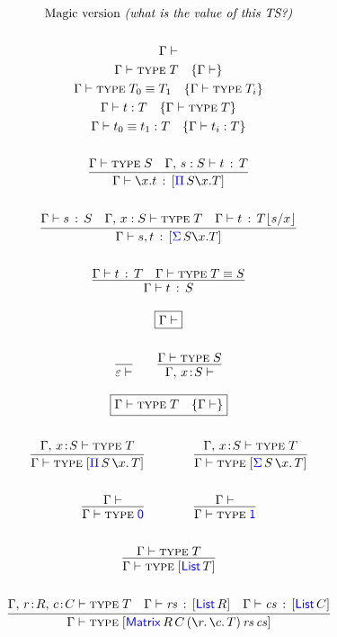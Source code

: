 \documentclass[12pt, a4paper]{article}
\newcommand{\bsl}{\texttt{\symbol{92}}}
\newcommand{\Type}{\textsc{type}\;}
\newcommand{\Zero}{\single{\D{0}}}
\newcommand{\One}{\single{\D{1}}}
\newcommand{\gp}{\,}
\newcommand{\forms}[3]{
  \ifthenelse{\equal{{#2}}{}}
  {\textcolor{#3}{\gp {#1}}}
  {[\textcolor{#3}{#1}\gp {#2}]}
}
\newcommand{\typeIntro}[2]{\forms{#1}{#2}{blue}}
\newcommand{\subst}[2]{{#1}\lfloor {#2} \rfloor}
\newcommand{\D}[1]{\textcolor{blue}{\mathsf{#1}}}
\newcommand{\List}[1]{[ \D{List} \gp {#1} ]}
\newcommand{\Matrix}[7]{[ \D{Matrix} \gp {#1} \gp {#2} \gp ( \la{#3}\la{#4} {#5}) \gp {#6} \gp {#7}]}
\newcommand{\MRCT}[2]{\Matrix{R}{C}{r}{c}{T}{#1}{#2}}
\newcommand{\ctxValid}[1]{{#1} \vdash}
\newcommand{\empCtx}{\varepsilon }
\newcommand{\ctxType}[2]{{#1} \vdash \Type {#2}}
\newcommand{\hasType}[3]{{#1} \vdash {#2} \hab {#3}}
\newcommand{\cs}{,\,}
\newcommand{\hb}{\!:\!}
\newcommand{\hab}{\gp : \gp}
\newcommand{\la}[1]{\bsl{#1}.\,}
\newcommand{\V}[1]{\mathit{#1}}
\newcommand{\single}[1]{#1}
\begin{document}
\begin{gather*}
  \text{Magic version \emph{(what is the value of this TS?)}}
  \\ \\
  \Gamma \vdash
  \\
  \Gamma \vdash \Type T \quad \{ \Gamma \vdash \}
  \\
  \Gamma \vdash \Type T_0 \equiv T_1 \quad \{ \Gamma \vdash \Type T_{i} \}
  \\
  \Gamma \vdash t : T  \quad \{ \Gamma \vdash \Type T \}
  \\
  \Gamma \vdash t_{0} \equiv t_{1} : T \quad \{ \Gamma \vdash t_{i} : T \}
  \\ \\
  \infer{\hasType{\Gamma}{\bsl x. t}{\typeIntro{\Pi}{S \bsl x. T}}}{\ctxType{\Gamma}{S} & \hasType{\Gamma \cs s : S}{t}{T}}
  \\ \\
  \infer{\hasType{\Gamma}{s, t}{\typeIntro{\Sigma}{S \bsl x. T}}}{\hasType{\Gamma}{s}{S} & \ctxType{\Gamma \cs x : S}{T} & \hasType{\Gamma}{t}{\subst{T}{s / x}}}
  \\ \\
  \infer
    {\hasType{\Gamma}{t}{S}}
    {\hasType{\Gamma}{t}{T} & \ctxType{\Gamma}{T \equiv S}}
\end{gather*}

\begin{gather*}
  \fbox{$\ctxValid{\Gamma}$}
  \\ \\
  \infer{\ctxValid{\empCtx}}{}
  \quad\quad
  \infer{\ctxValid{\Gamma\cs x \hb S}}{\ctxType{\Gamma}{S}}
\end{gather*}

\begin{gather*}
  \fbox{$\ctxType{\Gamma}{T} \quad \{{\ctxValid{\Gamma}}\}$}
  \\ \\
  \infer{\ctxType{\Gamma}{\typeIntro{\Pi}{S \gp\la{x} T}}}{\ctxType{\Gamma \cs x \hb S}{T}}
  \qquad\qquad
  \infer{\ctxType{\Gamma}{\typeIntro{\Sigma}{S \gp\la{x} T}}}{\ctxType{\Gamma \cs x \hb S}{T}}
  \\ \\
  \infer{\ctxType{\Gamma}{\Zero}}{\ctxValid{\Gamma}}
  \qquad\qquad
  \infer{\ctxType{\Gamma}{\One}}{\ctxValid{\Gamma}}
  \\ \\
  \infer{\ctxType{\Gamma}{\List{T}}}{\ctxType{\Gamma}{T}}
  \\ \\
  \infer{\ctxType{\Gamma}{\MRCT{\V{rs}}{\V{cs}}}}{
    \ctxType{\Gamma \cs r \hb  R \cs c \hb C}{T}
    & \hasType{\Gamma}{\V{rs}}{\List{R}} &\hasType{\Gamma}{\V{cs}}{\List{C}}
  }
\end{gather*}
\end{document}
